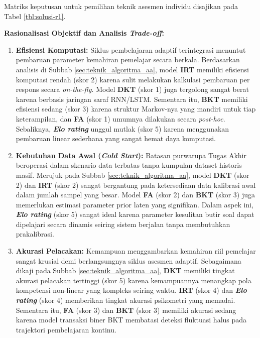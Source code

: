 Matriks keputusan untuk pemilihan teknik asesmen individu disajikan pada Tabel \ref{tbl:solusi-r1}.



\textbf{Rasionalisasi Objektif dan Analisis \textit{Trade-off}:}
\begin{enumerate}
    \item \textbf{Efisiensi Komputasi:} Siklus pembelajaran adaptif terintegrasi menuntut pembaruan parameter kemahiran pemelajar secara berkala. Berdasarkan analisis di Subbab \ref{sec:teknik_algoritma_aa}, model \textbf{IRT} memiliki efisiensi komputasi rendah (skor 2) karena sulit melakukan kalkulasi pembaruan per respons secara \textit{on-the-fly}. Model \textbf{DKT} (skor 1) juga tergolong sangat berat karena berbasis jaringan saraf RNN/LSTM. Sementara itu, \textbf{BKT} memiliki efisiensi sedang (skor 3) karena struktur Markov-nya yang mandiri untuk tiap keterampilan, dan \textbf{FA} (skor 1) umumnya dilakukan secara \textit{post-hoc}. Sebaliknya, \textbf{\textit{Elo rating}} unggul mutlak (skor 5) karena menggunakan pembaruan linear sederhana yang sangat hemat daya komputasi.
    
    \item \textbf{Kebutuhan Data Awal (\textit{Cold Start}):} Batasan purwarupa Tugas Akhir beroperasi dalam skenario data terbatas tanpa kumpulan dataset historis masif. Merujuk pada Subbab \ref{sec:teknik_algoritma_aa}, model \textbf{DKT} (skor 2) dan \textbf{IRT} (skor 2) sangat bergantung pada ketersediaan data kalibrasi awal dalam jumlah sampel yang besar. Model \textbf{FA} (skor 2) dan \textbf{BKT} (skor 3) juga memerlukan estimasi parameter prior laten yang signifikan. Dalam aspek ini, \textbf{\textit{Elo rating}} (skor 5) sangat ideal karena parameter kesulitan butir soal dapat dipelajari secara dinamis seiring sistem berjalan tanpa membutuhkan prakalibrasi.
    
    \item \textbf{Akurasi Pelacakan:} Kemampuan menggambarkan kemahiran riil pemelajar sangat krusial demi berlangsungnya siklus asesmen adaptif. Sebagaimana dikaji pada Subbab \ref{sec:teknik_algoritma_aa}, \textbf{DKT} memiliki tingkat akurasi pelacakan tertinggi (skor 5) karena kemampuannya menangkap pola kompetensi non-linear yang kompleks seiring waktu. \textbf{IRT} (skor 4) dan \textbf{\textit{Elo rating}} (skor 4) memberikan tingkat akurasi psikometri yang memadai. Sementara itu, \textbf{FA} (skor 3) dan \textbf{BKT} (skor 3) memiliki akurasi sedang karena model transaksi biner BKT membatasi deteksi fluktuasi halus pada trajektori pembelajaran kontinu.
    

\end{enumerate}
